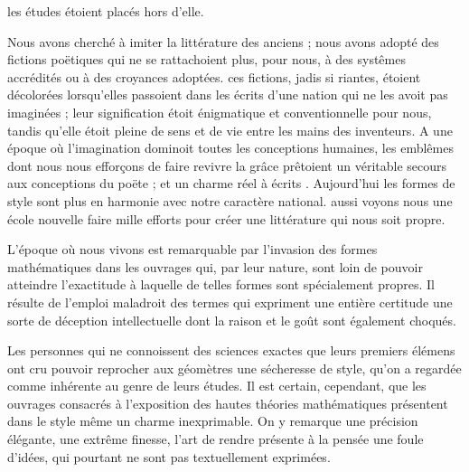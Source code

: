 \documentclass[11pt,a4paper]{article}
\begin{document}

les études étoient placés hors d'elle.

Nous avons cherché à imiter la littérature des anciens ; nous avons
adopté des fictions poëtiques qui ne se rattachoient plus, pour nous,
à des systêmes accrédités ou à des croyances adoptées. ces fictions,
jadis si riantes, étoient décolorées lorsqu'elles passoient dans les
écrits d'une nation qui ne les avoit pas imaginées ; leur signification
étoit énigmatique et conventionnelle pour nous, tandis 
qu'elle étoit pleine de sens et de vie entre les
mains des inventeurs. A une époque où l'imagination dominoit toutes
les conceptions humaines, les emblêmes dont nous nous efforçons de
faire revivre la grâce prêtoient un véritable secours aux conceptions
du poëte ;  et un charme réel
 à   écrits . Aujourd'hui les formes de style  sont plus en
harmonie avec notre caractère national. aussi voyons nous une école
nouvelle faire mille efforts pour créer une littérature qui nous soit
propre.

L'époque où nous vivons est remarquable par l'invasion des formes
mathématiques dans les ouvrages qui, par leur  nature,
sont loin de pouvoir  atteindre l'exactitude
 à laquelle de telles formes sont spécialement propres.
Il résulte de l'emploi maladroit des termes qui expriment une entière
certitude une sorte de déception intellectuelle dont la raison et le
goût sont également choqués. 

Les personnes qui ne connoissent des sciences exactes que leurs
premiers élémens ont cru pouvoir reprocher aux géomètres une sécheresse
de style, qu'on a regardée comme inhérente au genre de leurs études.
Il est certain, cependant, que les ouvrages consacrés à l'exposition des
hautes théories mathématiques présentent dans le style même un charme
inexprimable.  On y  remarque une
précision élégante, une extrême finesse, l'art de rendre présente à la
pensée une foule d'idées, qui pourtant ne sont pas textuellement
exprimées.
\end{document}
